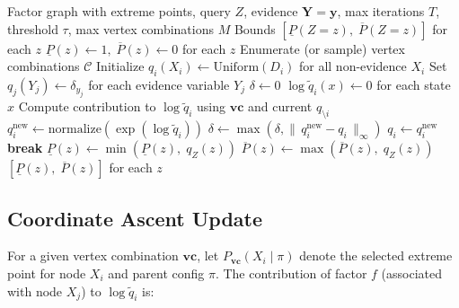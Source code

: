 \documentclass[11pt]{article}
\begin{document}
\begin{algorithm}[H]
\caption{Mean-Field Variational Inference for Credal Networks}
\label{alg:vi}
\begin{algorithmic}[1]
\Require Factor graph with extreme points, query $Z$, evidence $\mathbf{Y} = \mathbf{y}$,
         max iterations $T$, threshold $\tau$, max vertex combinations $M$
\Ensure Bounds $[\underline{P}(Z{=}z),\; \overline{P}(Z{=}z)]$ for each $z$
\Statex
\State $\underline{P}(z) \gets 1,\; \overline{P}(z) \gets 0$ for each $z$
\State Enumerate (or sample) vertex combinations $\mathcal{C}$
\Statex
{}
  \State Initialize $q_i(X_i) \gets \mathrm{Uniform}(D_i)$ for all non-evidence $X_i$
  \State Set $q_j(Y_j) \gets \delta_{y_j}$ for each evidence variable $Y_j$
  \Statex
    \State $\delta \gets 0$
      \State $\log \tilde{q}_i(x) \gets 0$ for each state $x$
        \State Compute contribution to $\log \tilde{q}_i$ using
               $\mathbf{vc}$ and current $q_{\setminus i}$
      \EndFor
      \State $q_i^{\mathrm{new}} \gets \mathrm{normalize}(\exp(\log \tilde{q}_i))$
      \State $\delta \gets \max(\delta, \|\,q_i^{\mathrm{new}} - q_i\,\|_\infty)$
      \State $q_i \gets q_i^{\mathrm{new}}$
    \EndFor
    \If{$\delta < \tau$} \textbf{break} \EndIf
  \EndFor
  \Statex
    \State $\underline{P}(z) \gets \min(\underline{P}(z),\; q_Z(z))$
    \State $\overline{P}(z) \gets \max(\overline{P}(z),\; q_Z(z))$
  \EndFor
\EndFor
\State \Return $[\underline{P}(z),\; \overline{P}(z)]$ for each $z$
\end{algorithmic}
\end{algorithm}

\subsection{Coordinate Ascent Update}\label{sec:update}

For a given vertex combination $\mathbf{vc}$, let $P_{\mathbf{vc}}(X_i \mid \pi)$
denote the selected extreme point for node $X_i$ and parent config $\pi$.
The contribution of factor $f$ (associated with node $X_j$) to $\log \tilde{q}_i$ is:
\end{document}
